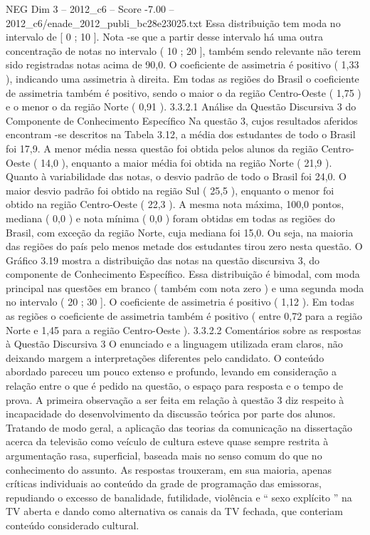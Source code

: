 \begin{textsample}{NEG Dim 3 – 2012\_c6 – Score -7.00 – 2012\_c6/enade\_2012\_publi\_bc28e23025.txt}
Essa distribuição tem moda no intervalo de [ 0 ; 10 ].
Nota -se que a partir desse intervalo há uma outra concentração de notas no intervalo ( 10 ; 20 ], também sendo relevante não terem sido registradas notas acima de 90,0.
O coeficiente de assimetria é positivo ( 1,33 ), indicando uma assimetria à direita.
Em todas as regiões do Brasil o coeficiente de assimetria também é positivo, sendo o maior o da região Centro-Oeste ( 1,75 ) e o menor o da região Norte ( 0,91 ). 3.3.2.1 Análise da Questão Discursiva 3 do Componente de Conhecimento Específico Na questão 3, cujos resultados aferidos encontram -se descritos na Tabela 3.12, a média dos estudantes de todo o Brasil foi 17,9.
A menor média nessa questão foi obtida pelos alunos da região Centro-Oeste ( 14,0 ), enquanto a maior média foi obtida na região Norte ( 21,9 ).
Quanto à variabilidade das notas, o desvio padrão de todo o Brasil foi 24,0.
O maior desvio padrão foi obtido na região Sul ( 25,5 ), enquanto o menor foi obtido na região Centro-Oeste ( 22,3 ).
A mesma nota máxima, 100,0 pontos, mediana ( 0,0 ) e nota mínima ( 0,0 ) foram obtidas em todas as regiões do Brasil, com exceção da região Norte, cuja mediana foi 15,0.
Ou seja, na maioria das regiões do país pelo menos metade dos estudantes tirou zero nesta questão.
O Gráfico 3.19 mostra a distribuição das notas na questão discursiva 3, do componente de Conhecimento Específico.
Essa distribuição é bimodal, com moda principal nas questões em branco ( também com nota zero ) e uma segunda moda no intervalo ( 20 ; 30 ].
O coeficiente de assimetria é positivo ( 1,12 ).
Em todas as regiões o coeficiente de assimetria também é positivo ( entre 0,72 para a região Norte e 1,45 para a região Centro-Oeste ). 3.3.2.2 Comentários sobre as respostas à Questão Discursiva 3 O enunciado e a linguagem utilizada eram claros, não deixando margem a interpretações diferentes pelo candidato.
O conteúdo abordado pareceu um pouco extenso e profundo, levando em consideração a relação entre o que é pedido na questão, o espaço para resposta e o tempo de prova.
A primeira observação a ser feita em relação à questão 3 diz respeito à incapacidade do desenvolvimento da discussão teórica por parte dos alunos.
Tratando de modo geral, a aplicação das teorias da comunicação na dissertação acerca da televisão como veículo de cultura esteve quase sempre restrita à argumentação rasa, superficial, baseada mais no senso comum do que no conhecimento do assunto.
As respostas trouxeram, em sua maioria, apenas críticas individuais ao conteúdo da grade de programação das emissoras, repudiando o excesso de banalidade, futilidade, violência e “ sexo explícito ” na TV aberta e dando como alternativa os canais da TV fechada, que conteriam conteúdo considerado cultural.

\end{textsample}
